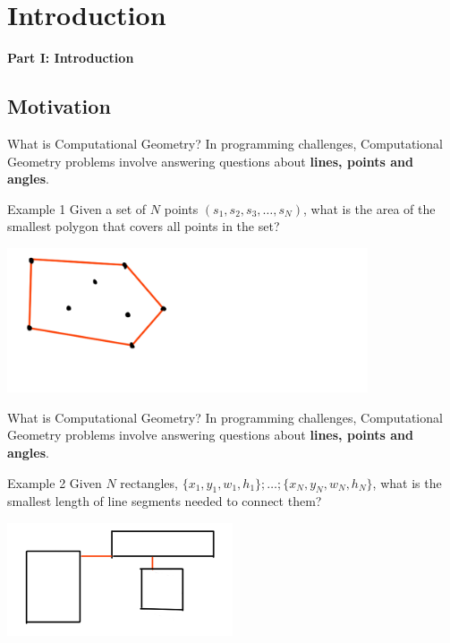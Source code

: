 
\section{Introduction}

\begin{frame}{}
  \begin{center}
    {\bf Part I: Introduction}
  \end{center}
\end{frame}

\subsection{Motivation}
\begin{frame}[t]{What is Computational Geometry?}
  In programming challenges, Computational Geometry problems involve answering questions about {\bf lines, points and angles}.

  \begin{block}{Example 1}
    Given a set of $N$ points $(s_1, s_2, s_3, \ldots, s_N)$, what is
    the area of the smallest polygon that covers all points in the set?
  \end{block}

  \centering
  \includegraphics[width=0.8\textwidth]{img/sampleproblem_1.png}
\end{frame}

\begin{frame}[t]{What is Computational Geometry?}
  In programming challenges, Computational Geometry problems involve answering questions about {\bf lines, points and angles}.

  \begin{block}{Example 2}
    Given $N$ rectangles, $\{x_1,y_1,w_1,h_1\}; \ldots; \{x_N, y_N, w_N, h_N\}$, what is the smallest length of line segments needed to connect them?
  \end{block}

  \centering
  \includegraphics[width=0.5\textwidth]{img/sampleproblem_2.png}
\end{frame}

